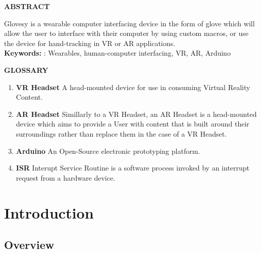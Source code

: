 \documentclass[12pt,a4paper,oneside]{book}
\theoremstyle{plain}
\numberwithin{equation}{chapter}
\renewcommand{\contentsname}{\hfill\bfseries\Large TABLE OF CONTENTS \hfill}
\renewcommand{\listfigurename}{\hfill\bfseries\Large LIST OF FIGURES}
\newcounter{Chapnum}
\newcounter{Secnum}
\begin{document}
\newpage

\begin{center}
  \large\textbf{ABSTRACT}\\
\end{center}
\noindent Glovesy is a wearable computer interfacing device in the form of glove which will allow the user to interface with their computer by using custom macros, or use the device for hand-tracking in VR or AR applications. \\
\noindent \textbf{Keywords:} : Wearables, human-computer interfacing, VR, AR, Arduino

\begin {center}
    \large\textbf{GLOSSARY}
\end{center}
\begin{enumerate}
    \item \textbf{VR Headset} A head-mounted device for use in consuming Virtual Reality Content.
    \item \textbf{AR Headset} Simillarly to a VR Headset, an AR Headset is a head-mounted device which aims to provide a User with content that is built around their surroundings rather than replace them in the case of a VR Headset.
    \item \textbf{Arduino} An Open-Source electronic prototyping platform.
    \item \textbf{ISR} Interupt Service Routine is a software process invoked by an interrupt request from a hardware device.
\end{enumerate}

\newpage

\renewcommand{\contentsname}{TABLE OF CONTENTS}

\newpage
\tableofcontents

{}
\renewcommand{\listfigurename}{LIST OF FIGURES}
\listoffigures

\newpage
\renewcommand*\thesection{\arabic{Chapnum}.\arabic{Secnum}}
\chapter*{Introduction}

\section{Overview}
\end{document}
